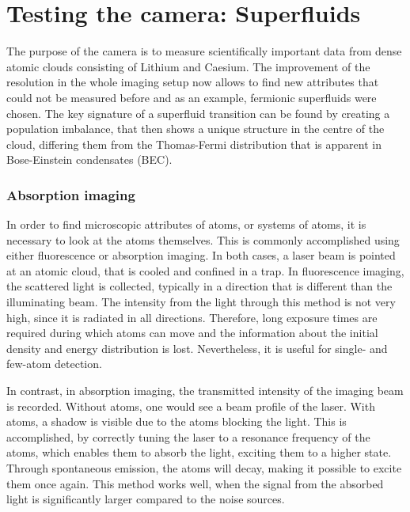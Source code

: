\chapter{Testing the camera: Superfluids}
The purpose of the camera is to measure scientifically important data from dense atomic clouds consisting of Lithium and Caesium.
The improvement of the resolution in the whole imaging setup now allows to find new attributes that could not be measured before and as an example, fermionic superfluids were chosen. The key signature of a superfluid transition can be found by creating a population imbalance, that then shows a unique structure in the centre of the cloud, differing them from the Thomas-Fermi distribution that is apparent in Bose-Einstein condensates (BEC).

\subsection{Absorption imaging} 
In order to find microscopic attributes of atoms, or systems of atoms, it is necessary to look at the atoms themselves. This is commonly accomplished using either fluorescence or absorption imaging. In both cases, a laser beam is pointed at an atomic cloud, that is cooled and confined in a trap. In fluorescence imaging, the scattered light is collected, typically in a direction that is different than the illuminating beam.
The intensity from the light through this method is not very high, since it is radiated in all directions. Therefore, long exposure times are required during which atoms can move and the information about the initial density and energy distribution is lost. Nevertheless, it is useful for single- and few-atom detection. 

In contrast, in absorption imaging, the transmitted intensity of the imaging beam is recorded. Without atoms, one would see a beam profile of the laser. With atoms, a shadow is visible due to the atoms blocking the light. This is accomplished, by correctly tuning the laser to a resonance frequency of the atoms, which enables them to absorb the light, exciting them to a higher state. Through spontaneous emission, the atoms will decay, making it possible to excite them once again. This method works well, when the signal from the absorbed light is significantly larger compared to the noise sources. 

